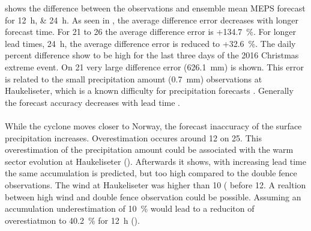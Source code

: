  shows the difference between the observations and ensemble mean MEPS forecast for \SIlist{12;24}{\hour}. As seen in , the average difference error decreases with longer forecast time. 
For \num{21} to \SI{26}{\dec} the average difference error is +\SI{134.7}{\percent}. For longer lead times, \SI{24}{\hour}, the average difference error is reduced to +\SI{32.6}{\percent}. The daily percent difference show to be high for the last three days of the 2016 Christmas extreme event. On \SI{21}{\dec} very large difference error (\SI{626.1}{\mm}) is shown. This error is related to the small precipitation amount (\SI{0.7}{\mm}) observations at Haukeliseter, which is a known difficulty for precipitation forecasts \citep{muller_arome-metcoop:_2017}. Generally the forecast accuracy decreases with lead time \citep{kalnay_atmospheric_2003}.
\\
\\
While the cyclone moves closer to Norway, the forecast inaccuracy of the surface precipitation increases. Overestimation occures around \SI{12}{\UTC} on \SI{25}{\dec}. This overestimation of the precipitation amount could be associated with the warm sector evolution at Haukeliseter (). Afterwards it shows, with increasing lead time the same accumulation is predicted, but too high compared to the double fence observations.
The wind at Haukeliseter was higher than \SI{10}{\mPs} ( before \SI{12}{\UTC}. A realtion between high wind and double fence observation could be possible. Assuming an accumulation underestimation of \SI{10}{\percent} would lead to a reduciton of overestiatmon to \SI{40.2}{\percent} for \SI{12}{\hour} ().
